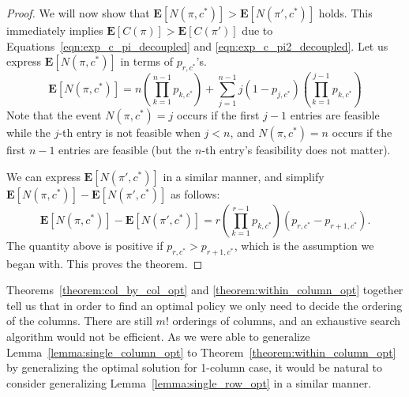 \begin{proof}
 	We will now show that $\mathbf{E}[N(\pi, c^*)] > \mathbf{E}[N(\pi', c^*)]$ holds. 
 	This immediately implies $\mathbf{E}[C(\pi)] > \mathbf{E}[C(\pi')]$ due to Equations~\ref{eqn:exp_c_pi_decoupled} and \ref{eqn:exp_c_pi2_decoupled}.
 	Let us express $\mathbf{E}[N(\pi, c^*)]$ in terms of $p_{r,c^*}$'s.
 	\begin{equation*}
 		\mathbf{E}[N(\pi, c^*)] = n\left( \prod_{k=1}^{n-1} p_{k,c^*}\right) + 
 		\sum_{j=1}^{n-1} j (1-p_{j,c^*}) \left( \prod_{k=1}^{j-1} p_{k,c^*} \right)
 	\end{equation*}
 	Note that the event $N(\pi, c^*) = j$ occurs if the first $j-1$ entries are feasible while the $j$-th entry is not feasible when $j < n$, and $N(\pi, c^*) = n$ occurs if the first $n-1$ entries are feasible (but the $n$-th entry's feasibility does not matter).
	
 	We can express $\mathbf{E}[N(\pi', c^*)]$ in a similar manner, and simplify  $\mathbf{E}[N(\pi, c^*)] - \mathbf{E}[N(\pi', c^*)]$ as follows:
 	\small
 	\begin{equation*}
 		\mathbf{E}[N(\pi, c^*)] - \mathbf{E}[N(\pi', c^*)] = 
 		r \left( \prod_{k=1}^{r-1} p_{k,c^*} \right) (p_{r,c^*} - p_{r+1,c^*}).
 	\end{equation*}
 	\normalsize
 	The quantity above is positive if $p_{r,c^*} > p_{r+1,c^*}$, which is the assumption we began with.
 	This proves the theorem.
 \end{proof}


 Theorems~\ref{theorem:col_by_col_opt} and \ref{theorem:within_column_opt} together tell us that 
 in order to find an optimal policy we only need to decide the ordering of the columns. 
 There are still $m!$ orderings of columns, and an exhaustive search algorithm would not be efficient.
 As we were able to generalize Lemma~\ref{lemma:single_column_opt} to Theorem~\ref{theorem:within_column_opt} by generalizing the optimal solution for 1-column case, it would be natural to consider generalizing Lemma~\ref{lemma:single_row_opt} in a similar manner.

